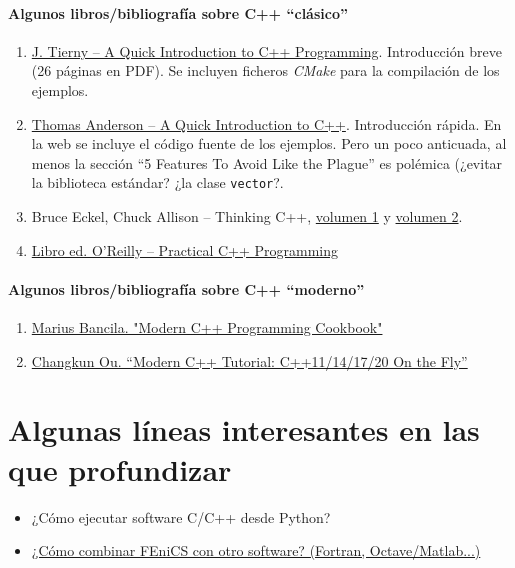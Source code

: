 \paragraph{Algunos libros/bibliografía sobre C++ ``clásico''}
\begin{enumerate}

\item \href{http://www-apr.lip6.fr/~tierny/stuff/teaching/tierny_visualization_introductionC++.pdf}{J. Tierny -- A Quick Introduction to C++ Programming}. Introducción breve (26 páginas en PDF). Se incluyen ficheros \textit{CMake} para la compilación de los ejemplos.
\item \href{https://homes.cs.washington.edu/~tom/c++example/}{Thomas Anderson -- A Quick Introduction to C++}. Introducción rápida. En la web se incluye el código fuente de los ejemplos. Pero un poco anticuada, al menos la sección ``5 Features To Avoid Like the Plague'' es polémica (¿evitar la biblioteca estándar? ¿la clase \texttt{vector}?.
\item Bruce Eckel, Chuck Allison -- Thinking C++, \href{http://vergil.chemistry.gatech.edu/resources/programming/pdf/TIC2Vone.pdf}{volumen 1} y \href{https://www.cs.rit.edu/~cs4/Thinking-in-C++2nd-ed-Volume-2.pdf}{volumen 2}.
\item \href{https://github.com/manish-old/ebooks-2/blob/master/O'Reilly\%20-\%20Practical\%20C\%2B\%2B\%20Programming.pdf}
{Libro ed. O'Reilly -- Practical C++ Programming}
\end{enumerate}

\paragraph{Algunos libros/bibliografía sobre C++ ``moderno''}
\begin{enumerate}
\item \href{https://consense.com.ua/en/lib/book/cpp_modern_cpp_progr_cookbook}{Marius Bancila.
"Modern C++ Programming Cookbook"}
\item \href{https://changkun.de/modern-cpp/pdf/modern-cpp-tutorial-en-us.pdf}{Changkun Ou. ``Modern C++ Tutorial: C++11/14/17/20 On the Fly''}

\end{enumerate}


\section{Algunas líneas interesantes en las que profundizar}
\label{sec:01:profundizar}


\begin{itemize}
\item ¿Cómo ejecutar software C/C++ desde Python?
\item \href{http://hplgit.github.io/fenics-mixed/doc/pub/fenics-mixed.html}{¿Cómo combinar FEniCS con otro software? (Fortran, Octave/Matlab...)}
\end{itemize}



